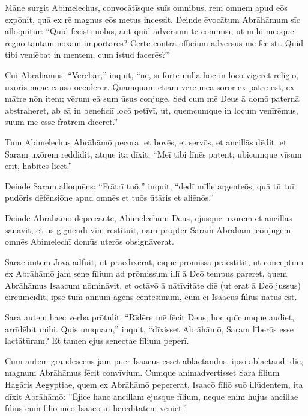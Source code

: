 \Versus Māne surgit Abimelechus, convocātīsque suīs omnibus, rem omnem apud eōs expōnit, quā ex rē magnus eōs metus incessit.
\Versus Deinde ēvocātum Abrāhāmum sīc alloquitur: ``Quid fēcistī nōbīs, aut quid adversum tē commīsī, ut mihi meōque rēgnō tantam noxam importārēs? Certē contrā officium adversus mē fēcistī.
\Versus Quid tibi veniēbat in mentem, cum istud facerēs?''

\Versus Cui Abrāhāmus: ``Verēbar,'' inquit, ``nē, sī forte nūlla hoc in locō vigēret religiō, uxōris meae causā occīderer.
\Versus Quamquam etiam vērē mea soror ex patre est, ex mātre nōn item; vērum eā sum ūsus conjuge.
\Versus Sed cum mē Deus ā domō paternā abstraheret, ab eā in beneficiī locō petīvī, ut, quemcumque in locum venīrēmus, suum mē esse frātrem dīceret.''

\Versus Tum Abimelechus Abrāhāmō pecora, et bovēs, et servōs, et ancillās dēdit, et Saram uxōrem reddidit,
\Versus atque ita dīxit: ``Meī tibi fīnēs patent; ubicumque vīsum erit, habitēs licet.''

\Versus Deinde Saram alloquēns: ``Frātrī tuō,'' inquit, ``dedī mīlle argenteōs, quā tū tuī pudōris dēfēnsiōne apud omnēs et tuōs ūtāris et aliēnōs.''

\Versus Deinde Abrāhāmō dēprecante, Abimelechum Deus, ejusque uxōrem et ancillās sānāvit, et iīs gignendī vim restituit,
\Versus nam propter Saram Abrāhāmī conjugem omnēs Abimelechī domūs uterōs obsignāverat.



\Caput
\Versus Sarae autem Jōva adfuit, ut praedīxerat, eīque prōmissa praestitit,
\Versus ut conceptum ex Abrāhāmō jam sene fīlium ad prōmissum illī ā Deō tempus pareret,
\Versus quem Abrāhāmus Isaacum nōmināvit,
\Versus et octāvō ā nātīvitāte diē (ut erat ā Deō jussus) circumcīdit,
\Versus ipse tum annum agēns centēsimum, cum eī Isaacus fīlius nātus est.

\Versus Sara autem haec verba prōtulit: ``Rīdēre mē fēcit Deus; hoc quīcumque audiet, arrīdēbit mihi.
\Versus Quis umquam,'' inquit, ``dīxisset Abrāhāmō, Saram līberōs esse lactātūram? Et tamen ejus senectae fīlium peperī.

\Versus Cum autem grandēscēns jam puer Isaacus esset ablactandus, ipsō ablactandī diē, magnum Abrāhāmus fēcit convīvium.
\Versus Cumque animadvertisset Sara fīlium Hagāris Aegyptiae, quem ex Abrāhāmō pepererat, Isaacō fīliō suō illūdentem,
\Versus ita dīxit Abrāhāmō: ''Ējice hanc ancillam ejusque fīlium, neque enim hujus ancillae fīlius cum fīliō meō Isaacō in hērēditātem veniet.''

